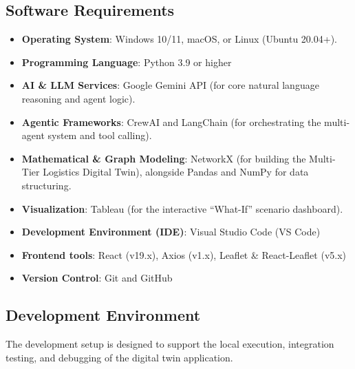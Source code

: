 \subsection[Software Requirements]{Software Requirements}
\begin{itemize}
    \item \textbf{Operating System}: Windows 10/11, macOS, or Linux (Ubuntu 20.04+).
    \item \textbf{Programming Language}: Python 3.9 or higher
    \item \textbf{AI \& LLM Services}: Google Gemini API (for core natural language reasoning and agent logic).
    \item \textbf{Agentic Frameworks}: CrewAI and LangChain (for orchestrating the multi-agent system and tool calling).
    \item \textbf{Mathematical \& Graph Modeling}: NetworkX (for building the Multi-Tier Logistics Digital Twin), alongside Pandas and NumPy for data structuring.
    \item \textbf{Visualization}: Tableau (for the interactive ``What-If'' scenario dashboard).
    \item \textbf{Development Environment (IDE)}: Visual Studio Code (VS Code)
    \item \textbf{Frontend tools}: React (v19.x), Axios (v1.x), Leaflet \& React-Leaflet (v5.x)
    \item \textbf{Version Control}: Git and GitHub
\end{itemize}


\subsection[Development Environment]{Development Environment}

The development setup is designed to support the local execution, integration testing, and debugging of the digital twin application.


